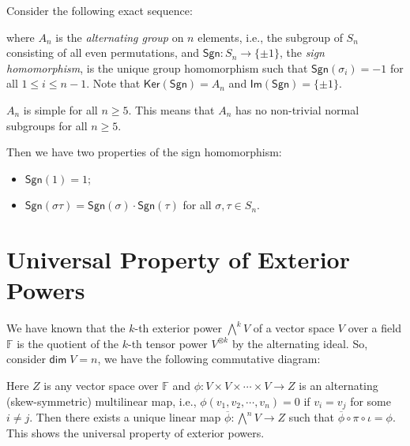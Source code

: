 \documentclass[
	11pt, %
	fleqn, %
	a4paper, %
]{LegrandOrangeBook}
\renewcommand{\ker}[1]{\mathsf{Ker}(#1)} %
\renewcommand{\Im}[1]{\mathsf{Im}(#1)} %
\renewcommand{\bar}[1]{\overline{#1}} %
\newcommand{\F}{\mathbb{F}} %
\renewcommand{\dim}{\mathsf{dim\;}} %
\newcommand{\sgn}{\mathsf{Sgn}} %
\begin{document}
Consider the following exact sequence:
\begin{center}
\end{center}
where $A_n$ is the \emph{alternating group} on $n$ elements, i.e., the subgroup of $S_n$ consisting of all even permutations, and $\sgn : S_n \to \{ \pm 1 \}$, the \emph{sign homomorphism}, is the unique group homomorphism such that $\sgn(\sigma_i) = -1$ for all $1 \leq i \leq n - 1$. Note that $\ker{\sgn} = A_n$ and $\Im{\sgn} = \{ \pm 1 \}$. 

\begin{remark}
    $A_n$ is simple for all $n \geq 5$. This means that $A_n$ has no non-trivial normal subgroups for all $n \geq 5$.
\end{remark}

Then we have two properties of the sign homomorphism:
\begin{itemize}
    \item $\sgn(1) = 1$;
    \item $\sgn(\sigma \tau) = \sgn(\sigma) \cdot \sgn(\tau)$ for all $\sigma, \tau \in S_n$.
\end{itemize}

\newpage

\section{Universal Property of Exterior Powers}

We have known that the $k$-th exterior power ${\bigwedge}^k V$ of a vector space $V$ over a field $\F$ is the quotient of the $k$-th tensor power $V^{\otimes k}$ by the alternating ideal. So, consider $\dim{V} = n$, we have the following commutative diagram:
\begin{center}
\end{center}
Here $Z$ is any vector space over $\F$ and $\phi : V \times V \times \cdots \times V \to Z$ is an alternating (skew-symmetric) multilinear map, i.e., $\phi(v_1, v_2, \cdots, v_n) = 0$ if $v_i = v_j$ for some $i \neq j$. Then there exists a unique linear map $\bar{\phi} : {\bigwedge}^n V \to Z$ such that $\bar{\phi} \circ \pi \circ \iota = \phi$. This shows the universal property of exterior powers.
\end{document}
